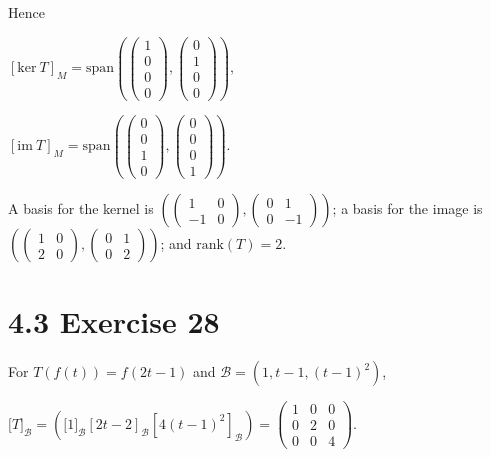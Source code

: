 Hence

\(\left\lbrack {\text{ker}\ T} \right\rbrack_{M} = \text{span}\left( {\begin{pmatrix}
1 \\
0 \\
0 \\
0
\end{pmatrix},\begin{pmatrix}
0 \\
1 \\
0 \\
0
\end{pmatrix}} \right),\)

\(\left\lbrack {\text{im}\ T} \right\rbrack_{M} = \text{span}\left( {\begin{pmatrix}
0 \\
0 \\
1 \\
0
\end{pmatrix},\begin{pmatrix}
0 \\
0 \\
0 \\
1
\end{pmatrix}} \right).\)

A basis for the kernel is \(\left( {\begin{pmatrix}
1 & 0 \\
{- 1} & 0
\end{pmatrix},\begin{pmatrix}
0 & 1 \\
0 & {- 1}
\end{pmatrix}} \right)\); a basis for the image is \(\left( {\begin{pmatrix}
1 & 0 \\
2 & 0
\end{pmatrix},\begin{pmatrix}
0 & 1 \\
0 & 2
\end{pmatrix}} \right)\); and \(\text{rank}(T) = 2\).

\section{4.3 Exercise 28}

For \(T\left( {f(t)} \right) = f\left( {2t - 1} \right)\) and \(\mathcal{B} = \left( {1,t - 1,\left( {t - 1} \right)^{2}} \right)\),

\(\lbrack T\rbrack_{\mathcal{B}} = \left( {\lbrack 1\rbrack_{\mathcal{B}}\left\lbrack {2t - 2} \right\rbrack_{\mathcal{B}}\left\lbrack {4\left( {t - 1} \right)^{2}} \right\rbrack_{\mathcal{B}}} \right) = \begin{pmatrix}
1 & 0 & 0 \\
0 & 2 & 0 \\
0 & 0 & 4
\end{pmatrix}.\)

